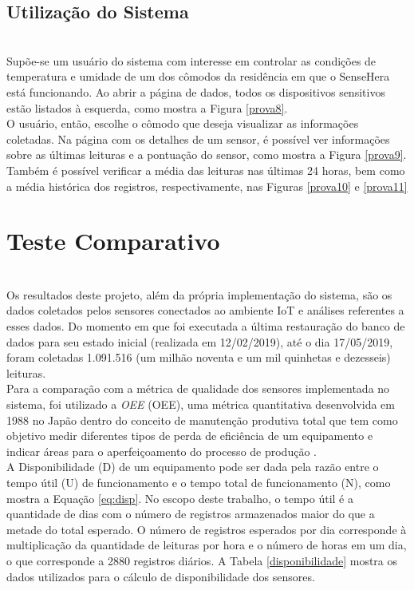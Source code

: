 \subsection{Utilização do Sistema}
\label{subsec:utilizacao}
\\\null \quad Supõe-se um usuário do sistema com interesse em controlar as condições de temperatura e umidade de um dos cômodos da residência em que o SenseHera está funcionando. Ao abrir a página de dados, todos os dispositivos sensitivos estão listados à esquerda, como mostra a Figura \ref{prova8}.
\\\null \quad O usuário, então, escolhe o cômodo que deseja visualizar as informações coletadas. Na página com os detalhes de um sensor, é possível ver informações sobre as últimas leituras e a pontuação do sensor, como mostra a Figura \ref{prova9}. Também é possível verificar a média das leituras nas últimas 24 horas, bem como a média histórica dos registros, respectivamente, nas Figuras \ref{prova10} e \ref{prova11}
 \section{Teste Comparativo}
 \label{sec:testecomparativo}
\\\null \quad Os resultados deste projeto, além da própria implementação do sistema, são os dados coletados pelos sensores conectados ao ambiente \acrshort{IoT} e análises referentes a esses dados.
 Do momento em que foi executada a última restauração do banco de dados para seu estado inicial (realizada em 12/02/2019), até o dia 17/05/2019, foram coletadas 1.091.516 (um milhão noventa e um mil quinhetas e dezesseis) leituras.
\\\null \quad Para a comparação com a métrica de qualidade dos sensores implementada no sistema, foi utilizado a \textit{\acrlong{OEE}} (\acrshort{OEE}), uma métrica quantitativa desenvolvida em 1988 no Japão dentro do conceito de manutenção produtiva total que tem como objetivo medir diferentes tipos de perda de eficiência de um equipamento e indicar áreas para o aperfeiçoamento do processo de produção \cite{artigoOEE}.
\\\null \quad A Disponibilidade (D) de um equipamento pode ser dada pela razão entre o tempo útil (U) de funcionamento e o tempo total de funcionamento (N), como mostra a Equação \ref{eq:disp}. No escopo deste trabalho, o tempo útil é a quantidade de dias com o número de registros armazenados maior do que a metade do total esperado. O número de registros esperados por dia corresponde à multiplicação da quantidade de leituras por hora e o número de horas em um dia, o que corresponde a 2880 registros diários. A Tabela \ref{disponibilidade} mostra os dados utilizados para o cálculo de disponibilidade dos sensores.

